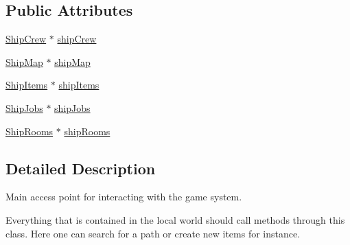 \subsection*{Public Attributes}
\begin{DoxyCompactItemize}
\item 
\hyperlink{classShipCrew}{Ship\-Crew} $\ast$ \hyperlink{classShipMaster_a7f0c72b72e582c85dd582a1ffdceabdb}{ship\-Crew}
\item 
\hyperlink{classShipMap}{Ship\-Map} $\ast$ \hyperlink{classShipMaster_ad9033bf87a43b439646616bbc92dfe03}{ship\-Map}
\item 
\hyperlink{classShipItems}{Ship\-Items} $\ast$ \hyperlink{classShipMaster_a9eedfb4e38a7b7db557ce2d1330bfe4e}{ship\-Items}
\item 
\hyperlink{classShipJobs}{Ship\-Jobs} $\ast$ \hyperlink{classShipMaster_a1a204eb61598354bc650c3322d132a33}{ship\-Jobs}
\item 
\hyperlink{classShipRooms}{Ship\-Rooms} $\ast$ \hyperlink{classShipMaster_a8a39f20c1107f8d6f6c081817e40dbfd}{ship\-Rooms}
\end{DoxyCompactItemize}


\subsection{Detailed Description}
Main access point for interacting with the game system. 

Everything that is contained in the local world should call methods through this class. Here one can search for a path or create new items for instance. 

